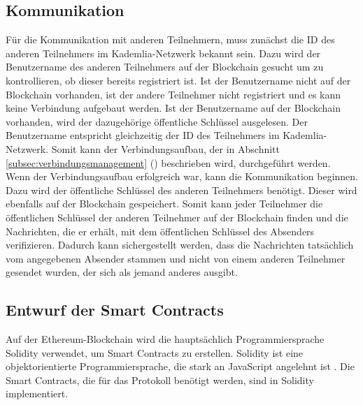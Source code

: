 \subsection{Kommunikation}
Für die Kommunikation mit anderen Teilnehmern, muss zunächst die ID des anderen Teilnehmers im Kademlia-Netzwerk bekannt sein. Dazu wird der Benutzername des anderen Teilnehmers auf der Blockchain gesucht um zu kontrollieren, ob dieser bereits registriert ist. Ist der Benutzername nicht auf der Blockchain vorhanden, ist der andere Teilnehmer nicht registriert und es kann keine Verbindung aufgebaut werden. Ist der Benutzername auf der Blockchain vorhanden, wird der dazugehörige öffentliche Schlüssel ausgelesen. Der Benutzername entspricht gleichzeitig der ID des Teilnehmers im Kademlia-Netzwerk. Somit kann der Verbindungsaufbau, der in Abschnitt \ref{subsec:verbindungsmanagement} () beschrieben wird, durchgeführt werden.
Wenn der Verbindungsaufbau erfolgreich war, kann die Kommunikation beginnen. Dazu wird der öffentliche Schlüssel des anderen Teilnehmers benötigt. Dieser wird ebenfalls auf der Blockchain gespeichert. Somit kann jeder Teilnehmer die öffentlichen Schlüssel der anderen Teilnehmer auf der Blockchain finden und die Nachrichten, die er erhält, mit dem öffentlichen Schlüssel des Absenders verifizieren. Dadurch kann sichergestellt werden, dass die Nachrichten tatsächlich vom angegebenen Absender stammen und nicht von einem anderen Teilnehmer gesendet wurden, der sich als jemand anderes ausgibt.

\subsection{Entwurf der Smart Contracts}
\label{subsec:smartcontracts}

Auf der Ethereum-Blockchain wird die hauptsächlich Programmiersprache Solidity verwendet, um Smart Contracts zu erstellen. Solidity ist eine objektorientierte Programmiersprache, die stark an JavaScript angelehnt ist \parencite[S. 131]{Antonopoulos_MasteringEthereum}. Die Smart Contracts, die für das Protokoll benötigt werden, sind in Solidity implementiert.


